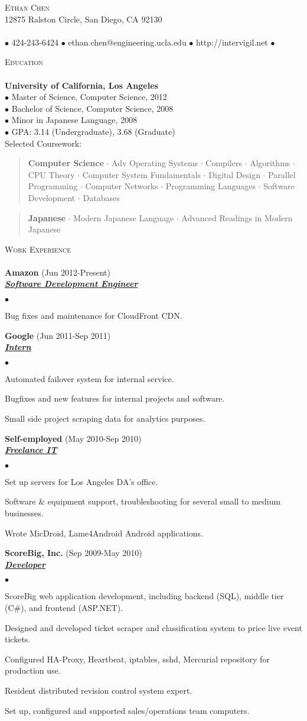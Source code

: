 \documentclass{article}
\newcommand{\area}[2]{\vspace*{-9pt} \begin{verse}\textbf{#1}   #2 \end{verse}  }
\newcommand{\lineunder}{\vspace*{-8pt} \\ \hspace*{-18pt} \hrulefill \\}
\newcommand{\header}[1]{{\hspace*{-15pt}\vspace*{6pt} \textsc{#1}} \vspace*{-6pt} \lineunder}
\newcommand{\employer}[3]{{ \textbf{#1} (#2)\\ \underline{\textbf{\emph{#3}}}\\  }}
\newcommand{\contact}[3]{
\vspace*{-8pt}
\begin{center}
{\LARGE \scshape {#1}}\\
#2 \lineunder
#3
\end{center}
\vspace*{-8pt}
}
\newenvironment{achievements}{\begin{list}{$\bullet$}{\topsep 0pt \itemsep -2pt}}{\vspace*{4pt}\end{list}}
\newcommand{\schoolwithcourses}[5]{
 \textbf{#1} \\
 $\bullet$ #2 \\
 $\bullet$ #3 \\
 $\bullet$ #4 \\
 $\bullet$ #5 \\  Selected Coursework:\\
\vspace*{5pt}
}
\begin{document}
\small
\smallskip
\vspace*{-44pt}

\contact{Ethan Chen}
{12875 Ralston Circle, San Diego, CA 92130}
{$\bullet$ 424-243-6424 $\bullet$ ethan.chen@engineering.ucla.edu $\bullet$ http://intervigil.net $\bullet$}

\header{Education}
\schoolwithcourses{University of California, Los Angeles}
{Master of Science, Computer Science, 2012}
{Bachelor of Science, Computer Science, 2008}
{Minor in Japanese Language, 2008}
{GPA: 3.14 (Undergraduate), 3.68 (Graduate)}
  \area{Computer Science}{ $\cdot$ Adv Operating Systems $\cdot$ Compilers $\cdot$ Algorithms $\cdot$ CPU Theory $\cdot$ Computer System Fundamentals $\cdot$ Digital Design $\cdot$ Parallel Programming $\cdot$ Computer Networks $\cdot$ Programming Languages $\cdot$ Software Development $\cdot$ Databases }
  \area{Japanese}{ $\cdot$ Modern Japanese Language $\cdot$ Advanced Readings in Modern Japanese }

\header{Work Experience}
\employer{Amazon}{Jun 2012-Present}{Software Development Engineer}
  \begin{achievements}
    \item Bug fixes and maintenance for CloudFront CDN.
  \end{achievements}

\employer{Google}{Jun 2011-Sep 2011}{Intern}
  \begin{achievements}
    \item Automated failover system for internal service.
    \item Bugfixes and new features for internal projects and software.
    \item Small side project scraping data for analytics purposes.
  \end{achievements}

\employer{Self-employed}{May 2010-Sep 2010}{Freelance IT}
  \begin{achievements}
    \item Set up servers for Los Angeles DA's office.
    \item Software \& equipment support, troubleshooting for several small to medium businesses.
    \item Wrote MicDroid, Lame4Android Android applications.
  \end{achievements}

\employer{ScoreBig, Inc.}{Sep 2009-May 2010}{Developer}
  \begin{achievements}
    \item ScoreBig web application development, including backend (SQL), middle tier (C\#), and frontend (ASP.NET).
    \item Designed and developed ticket scraper and classification system to price live event tickets.
    \item Configured HA-Proxy, Heartbeat, iptables, sshd, Mercurial repository for production use.
    \item Resident distributed revision control system expert.
    \item Set up, configured and supported sales/operations team computers.
  \end{achievements}
\end{document}
